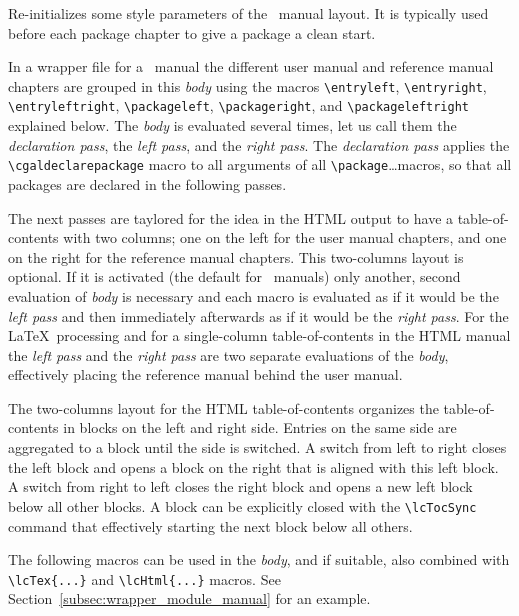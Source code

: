 \begin{description}
    Re-initializes some style parameters of the \CC\ manual layout. It
    is typically used before each package chapter to give a package a
    clean start.

    In a wrapper file for a \cgal\ manual the different user manual
    and reference manual chapters are grouped in this \emph{body\/} using the
    macros \verb|\entryleft|, \verb|\entryright|, \verb|\entryleftright|, 
    \verb|\packageleft|, \verb|\packageright|, and
    \verb|\packageleftright| explained below. The \emph{body\/} is
    evaluated several times, let us call them the \emph{declaration pass},
    the \emph{left pass}, and the \emph{right pass}. The \emph{declaration 
      pass\/} applies the \verb|\cgaldeclarepackage| macro to all arguments 
    of all \verb|\package|\ldots macros, so that all packages are declared in
    the following passes. 

    The next passes are taylored for the
    idea in the HTML output to have a table-of-contents with two
    columns; one on the left for the user manual chapters, and one on
    the right for the reference manual chapters. This two-columns
    layout is optional. If it is activated (the default for \cgal\
    manuals) only another, second evaluation of \emph{body\/} is
    necessary and each macro is evaluated as if it would be the
    \emph{left pass} and then immediately afterwards as if it would be
    the \emph{right pass}. For the \LaTeX\ processing and for a single-column
    table-of-contents in the HTML manual the \emph{left pass} and the
    \emph{right pass} are two separate evaluations of the \emph{body},
    effectively placing the reference manual behind the user manual.

    The two-columns layout for the HTML table-of-contents organizes
    the table-of-contents in blocks on the left and right
    side. Entries on the same side are aggregated to a block until the
    side is switched. A switch from left to right closes the left
    block and opens a block on the right that is aligned with this left block.
    A switch from right to left closes the right block and opens a new
    left block below all other blocks.
    A block can be explicitly closed with the \verb|\lcTocSync|
    command that effectively starting the next block below all others.

    The following macros can be used in the \emph{body}, and if
    suitable, also combined with \verb|\lcTex{...}| and
    \verb|\lcHtml{...}| macros. See Section~\ref{subsec:wrapper_module_manual} 
    for an example. 


\end{description}
